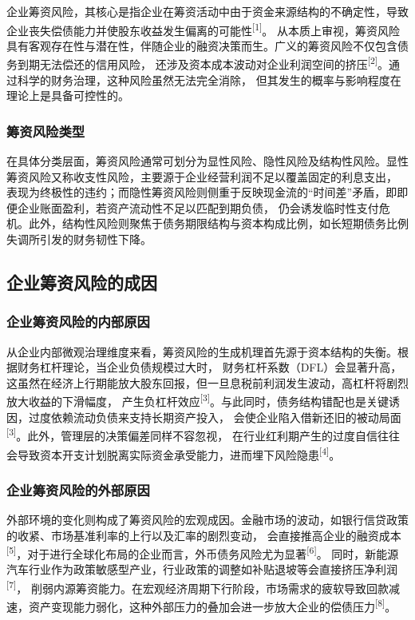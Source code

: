 \documentclass[12pt,a4paper,fontset=windows,UTF8]{ctexart}
\begin{document}
企业筹资风险，其核心是指企业在筹资活动中由于资金来源结构的不确定性，导致企业丧失偿债能力并使股东收益发生偏离的可能性\textsuperscript{[1]}。
  从本质上审视，筹资风险具有客观存在性与潜在性，伴随企业的融资决策而生。广义的筹资风险不仅包含债务到期无法偿还的信用风险，
  还涉及资本成本波动对企业利润空间的挤压\textsuperscript{[2]}。通过科学的财务治理，这种风险虽然无法完全消除，
  但其发生的概率与影响程度在理论上是具备可控性的。

\subsubsection{筹资风险类型}

在具体分类层面，筹资风险通常可划分为显性风险、隐性风险及结构性风险。显性筹资风险又称收支性风险，主要源于企业经营利润不足以覆盖固定的利息支出，
  表现为终极性的违约；而隐性筹资风险则侧重于反映现金流的“时间差”矛盾，即即便企业账面盈利，若资产流动性不足以匹配到期负债，
  仍会诱发临时性支付危机。此外，结构性风险则聚焦于债务期限结构与资本构成比例，如长短期债务比例失调所引发的财务韧性下降。

\subsection{企业筹资风险的成因}

\subsubsection{企业筹资风险的内部原因}

从企业内部微观治理维度来看，筹资风险的生成机理首先源于资本结构的失衡。根据财务杠杆理论，当企业负债规模过大时，
  财务杠杆系数（DFL）会显著升高，这虽然在经济上行期能放大股东回报，但一旦息税前利润发生波动，高杠杆将剧烈放大收益的下滑幅度，
  产生负杠杆效应\textsuperscript{[3]}。与此同时，债务结构错配也是关键诱因，过度依赖流动负债来支持长期资产投入，
  会使企业陷入借新还旧的被动局面\textsuperscript{[3]}。此外，管理层的决策偏差同样不容忽视，
  在行业红利期产生的过度自信往往会导致资本开支计划脱离实际资金承受能力，进而埋下风险隐患\textsuperscript{[4]}。

\subsubsection{企业筹资风险的外部原因}

外部环境的变化则构成了筹资风险的宏观成因。金融市场的波动，如银行信贷政策的收紧、市场基准利率的上行以及汇率的剧烈变动，
  会直接推高企业的融资成本\textsuperscript{[5]}，对于进行全球化布局的企业而言，外币债务风险尤为显著\textsuperscript{[6]}。
  同时，新能源汽车行业作为政策敏感型产业，行业政策的调整如补贴退坡等会直接挤压净利润\textsuperscript{[7]}，
  削弱内源筹资能力。在宏观经济周期下行阶段，市场需求的疲软导致回款减速，资产变现能力弱化，这种外部压力的叠加会进一步放大企业的偿债压力\textsuperscript{[8]}。
\end{document}
